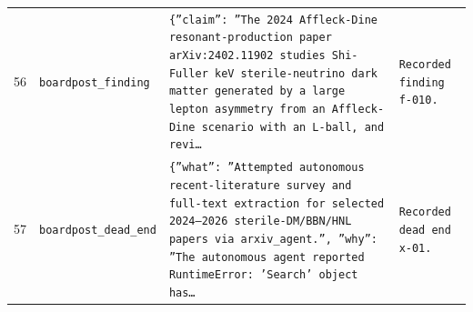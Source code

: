 \documentclass[11pt,a4paper]{article}
\begin{document}
\begin{longtable}{@{}p{}p{}p{}p{}@{}}
56 & \texttt{board}\newline\texttt{post\_\allowbreak{}finding} & \texttt{\{''claim'':\allowbreak{} ''The 2024 Affleck-Dine resonant-production paper arXiv:\allowbreak{}2402.11902 studies Shi-Fuller keV sterile-neutrino dark matter generated by a large lepton asymmetry from an Affleck-Dine scenario with an L-ball,\allowbreak{} and revi\ldots{}\allowbreak{}} & \texttt{Recorded finding f-010.} \\
57 & \texttt{board}\newline\texttt{post\_\allowbreak{}dead\_\allowbreak{}end} & \texttt{\{''what'':\allowbreak{} ''Attempted autonomous recent-literature survey and full-text extraction for selected 2024--2026 sterile-DM/\allowbreak{}BBN/\allowbreak{}HNL papers via arxiv\_\allowbreak{}agent.'',\allowbreak{} ''why'':\allowbreak{} ''The autonomous agent reported RuntimeError:\allowbreak{} 'Search' object has\ldots{}\allowbreak{}} & \texttt{Recorded dead end x-01.} \\
\bottomrule\end{longtable}
\end{document}
